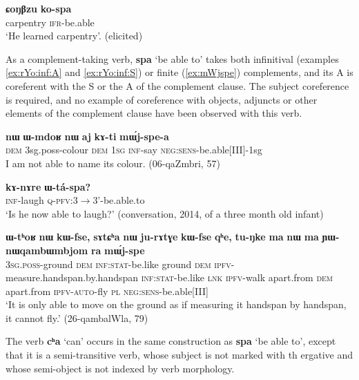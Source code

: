 \documentclass[oneside,a4paper,11pt]{article}
\newcommand{\ipa}[1]{\textbf{\phon#1}} %
\newcommand{\jpg}[2]{\ipa{#1} `#2'} %
\begin{document}
\begin{exe}
\ex \label{ex:kospa}
\gll \ipa{ɕoŋβzu}	\ipa{ko-spa} \\
carpentry \textsc{ifr}-be.able \\
\glt `He learned carpentry'. (elicited)
\end{exe}

As a complement-taking verb, \jpg{spa}{be able to} takes both infinitival (examples \ref{ex:rYo:inf:A} and \ref{ex:rYo:inf:S}) or finite (\ref{ex:mWjspe}) complements, and its A is coreferent with the S or the A of the complement clause. The subject coreference is required, and no example of coreference with objects, adjuncts or other elements of the complement clause have been observed with this verb.

\begin{exe}
\ex  \label{ex:rYo:inf:A}
\gll
\ipa{nɯ} 	\ipa{ɯ-mdoʁ} 	\ipa{nɯ} 	\ipa{aj} 	\ipa{kɤ-ti} 	\ipa{mɯ́j-spe-a} \\
\textsc{dem} 3sg.poss-colour \textsc{dem} \textsc{1sg} \textsc{inf}-say \textsc{neg:sens}-be.able[III]-1sg \\
\glt I am not able to name its colour. (06-qaZmbri, 57)
\end{exe}

\begin{exe}
\ex  \label{ex:rYo:inf:S}
\gll 
 \ipa{kɤ-nɤre} 	\ipa{ɯ-tá-spa?}\\
 \textsc{inf}-laugh \textsc{q-pfv}:3$\rightarrow$3'-be.able.to\\
 \glt `Is he now able to laugh?' (conversation, 2014, of a three month old infant)
\end{exe}


\begin{exe}
\ex \label{ex:mWjspe}
\gll \ipa{ɯ-tʰoʁ}	\ipa{nɯ}	\ipa{kɯ-fse,}	\ipa{sɤtɕʰa}	\ipa{nɯ}	\ipa{ju-rɤtɣe}	\ipa{kɯ-fse}	\ipa{qʰe,}	\ipa{tu-ŋke}	\ipa{ma}	\ipa{nɯ}	\ipa{ma}	\ipa{ɲɯ-nɯqambɯmbjom}	\ipa{ra}	\ipa{mɯ́j-spe} \\
\textsc{3sg.poss}-ground \textsc{dem} \textsc{inf:stat}-be.like ground \textsc{dem}  \textsc{ipfv}-measure.handspan.by.handspan \textsc{inf:stat}-be.like  \textsc{lnk} \textsc{ipfv}-walk apart.from \textsc{dem} apart.from \textsc{ipfv-auto}-fly \textsc{pl} \textsc{neg:sens}-be.able[III] \\
\glt  `It is only able to move on the ground as if measuring it handspan by handspan, it cannot fly.' (26-qambalWla, 79)
\end{exe}
 
The verb \jpg{cʰa}{can} occurs in the same construction as \jpg{spa}{be able to}, except that it is a semi-transitive verb, whose subject is not marked with th ergative and whose semi-object is not indexed by verb morphology.
\end{document}
